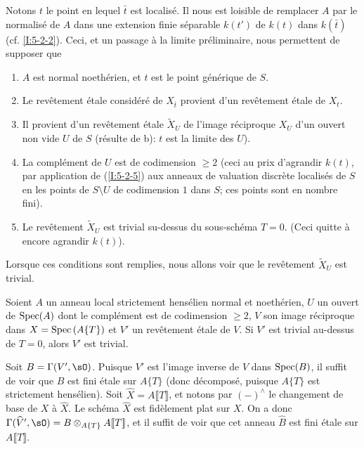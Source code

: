 Notons $t$ le point en lequel $\bar t$ est localisé. Il nous est loisible de 
remplacer $A$ par le normalisé de $A$ dans une extension finie séparable 
$k(t')$ de $k(t)$ dans $k(\bar t)$ (cf. \ref{I:5-2-2}). Ceci, et un passage à 
la limite préliminaire, nous permettent de supposer que 
\begin{enumerate}[\indent a)]
  \item $A$ est normal noethérien, et $t$ est le point générique de $S$.
  \item Le revêtement étale considéré de $X_{\bar t}$ provient d'un 
    revêtement étale de $X_t$. 
  \item Il provient d'un revêtement étale $\widetilde X_U$ de l'image 
    réciproque $X_U$ d'un ouvert non vide $U$ de $S$ (résulte de b): $t$ 
    est la limite des $U$).
  \item La complément de $U$ est de codimension $\geqslant 2$ (ceci au prix 
    d'agrandir $k(t)$, par application de (\ref{I:5-2-5}) aux anneaux de 
    valuation discrète localisés de $S$ en les points de $S\setminus U$ de 
    codimension $1$ dans $S$; ces points sont en nombre fini). 
  \item Le revêtement $\widetilde X_U$ est trivial su-dessus du sous-schéma 
    $T=0$. (Ceci quitte à encore agrandir $k(t)$). 
\end{enumerate}

Lorsque ces conditions sont remplies, nous allons voir que le revêtement 
$\widetilde X_U$ est trivial. 





\begin{lemma}\label{I:5-2-7} %
Soient $A$ un anneau local strictement hensélien normal et noethérien, $U$ 
un ouvert de $\operatorname{Spec}(A)$ dont le complément est de codimension $\geqslant 2$, 
$V$ son image réciproque dans $X=\operatorname{Spec}\left(A\{T\}\right)$ et $V'$ un 
revêtement étale de $V$. Si $V'$ est trivial au-dessus de $T=0$, alors $V'$ 
est trivial. 
\end{lemma}

Soit $B=\Gamma(V',\sO)$. Puisque $V'$ est l'image inverse de $V$ dans 
$\operatorname{Spec}(B)$, il suffit de voir que $B$ est fini étale sur $A\{T\}$ (donc 
décomposé, puisque $A\{T\}$ est strictement hensélien). Soit 
$\widehat X=A\llbracket T\rrbracket$, et notons par $(-)^\wedge$ le changement 
de base de $X$ à $\widehat X$. Le schéma $\widehat X$ est fidèlement plat 
sur $X$. On a donc 
$\Gamma(\widehat V',\sO) = B\otimes_{A\{T\}} A\llbracket T\rrbracket$, et il 
suffit de voir que cet anneau $\widehat B$ est fini étale sur 
$A\llbracket T\rrbracket$. 


